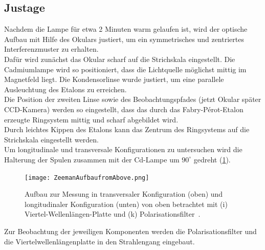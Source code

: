 \subsection{Justage}
Nachdem die Lampe für etwa 2 Minuten warm gelaufen ist, wird der optische Aufbau mit Hilfe des Okulars justiert, um ein symmetrisches und zentriertes Interferenzmuster zu erhalten.\\
Dafür wird zunächst das Okular scharf auf die Strichskala eingestellt. Die Cadmiumlampe wird so positioniert, dass die Lichtquelle möglichst mittig im Magnetfeld liegt. Die Kondensorlinse wurde justiert, um eine parallele Ausleuchtung des Etalons zu erreichen.\\
Die Position der zweiten Linse sowie des Beobachtungspfades (jetzt Okular später CCD-Kamera) werden so eingestellt, dass das durch das Fabry-Pérot-Etalon erzeugte Ringsystem mittig und scharf abgebildet wird.\\
Durch leichtes Kippen des Etalons kann das Zentrum des Ringsystems auf die Strichskala eingestellt werden.
\vspace{0.3cm}\\
Um longitudinale und transversale Konfigurationen zu untersuchen wird die Halterung der Spulen zusammen mit der Cd-Lampe um $90^{\circ}$ gedreht (\cref{fig:aufbau_zeemann_above}).\\
\begin{figure}[H]
    \centering
    \texttt{[image: ZeemanAufbaufromAbove.png]}
    \caption[Longitudinale und Transversale Konfiguration Zeemann-Effekt]{Aufbau zur Messung in transversaler Konfiguration (oben) und longitudinaler Konfiguration (unten) von oben betrachtet mit (i) Viertel-Wellenlängen-Platte und (k) Polarisationsfilter~\cite{LD}.}\label{fig:aufbau_zeemann_above}
\end{figure}
\noindent Zur Beobachtung der jeweiligen Komponenten werden die Polarisationsfilter und die Viertelwellenlängenplatte in den Strahlengang eingebaut.
%
%

